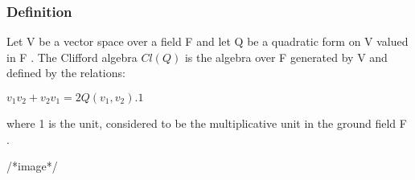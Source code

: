\label{definition}
\begin{frame}\frametitle{Definition}
  \begin{definition}
 Let V be a vector space over a field F and let Q be a quadratic form on V
valued in F . The Clifford algebra $Cl(Q)$ is the algebra over F generated by V and defined
by the relations:
\begin{center}
$v_{1} v_{2} + v_{2}v_{1} = 2Q(v_{1} , v_{2} ) . 1$
 
\end{center}

where 1 is the unit, considered to be the multiplicative unit in the ground field F .
  \end{definition}
  
  /*image*/
  
  
  
\end{frame}
